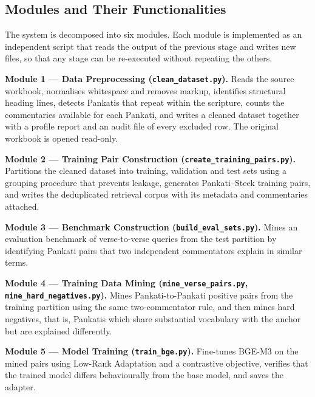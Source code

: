 \documentclass[12pt,a4paper]{article}
\begin{document}
\subsection{Modules and Their Functionalities}

The system is decomposed into six modules. Each module is implemented as an independent script that reads the output of the previous stage and writes new files, so that any stage can be re-executed without repeating the others.

\vspace{0.3cm}

\noindent\textbf{Module 1 --- Data Preprocessing (\texttt{clean\_dataset.py}).}
Reads the source workbook, normalises whitespace and removes markup, identifies structural heading lines, detects Pankatis that repeat within the scripture, counts the commentaries available for each Pankati, and writes a cleaned dataset together with a profile report and an audit file of every excluded row. The original workbook is opened read-only.

\vspace{0.3cm}

\noindent\textbf{Module 2 --- Training Pair Construction (\texttt{create\_training\_pairs.py}).}
Partitions the cleaned dataset into training, validation and test sets using a grouping procedure that prevents leakage, generates Pankati--Steek training pairs, and writes the deduplicated retrieval corpus with its metadata and commentaries attached.

\vspace{0.3cm}

\noindent\textbf{Module 3 --- Benchmark Construction (\texttt{build\_eval\_sets.py}).}
Mines an evaluation benchmark of verse-to-verse queries from the test partition by identifying Pankati pairs that two independent commentators explain in similar terms.

\vspace{0.3cm}

\noindent\textbf{Module 4 --- Training Data Mining (\texttt{mine\_verse\_pairs.py}, \texttt{mine\_hard\_negatives.py}).}
Mines Pankati-to-Pankati positive pairs from the training partition using the same two-commentator rule, and then mines hard negatives, that is, Pankatis which share substantial vocabulary with the anchor but are explained differently.

\vspace{0.3cm}

\noindent\textbf{Module 5 --- Model Training (\texttt{train\_bge.py}).}
Fine-tunes BGE-M3 on the mined pairs using Low-Rank Adaptation \cite{hu2022lora} and a contrastive objective, verifies that the trained model differs behaviourally from the base model, and saves the adapter.
\end{document}
